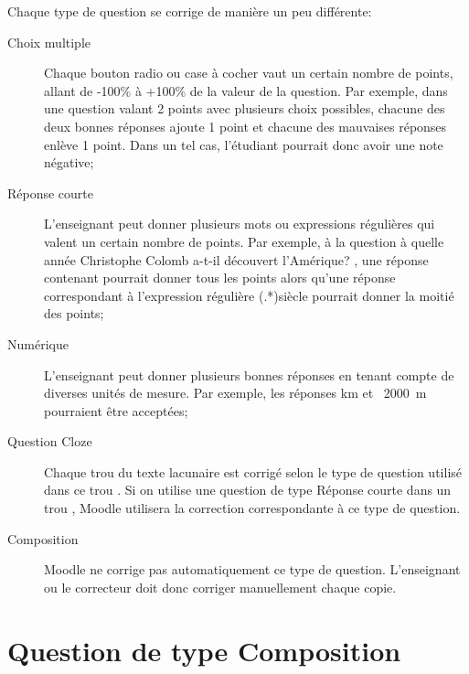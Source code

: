 \begin{minipage}{\linewidth}
Chaque type de question se corrige de mani\`ere un peu diff\'erente:
\begin{description}
  \item[Choix multiple]
  
  Chaque bouton radio ou case \`a cocher vaut un certain nombre de points, allant de -100\% \`a +100\% de la valeur de la question.
  Par exemple, dans une question valant 2 points avec plusieurs choix possibles, chacune des deux bonnes r\'eponses ajoute 1 point et chacune des mauvaises r\'eponses enl\`eve 1 point.
  Dans un tel cas, l'\'etudiant pourrait donc avoir une note n\'egative;
  
  \item[R\'eponse courte]
  
  L'enseignant peut donner plusieurs mots ou expressions r\'eguli\`eres qui valent un certain nombre de points. Par exemple,
  \`a la question \og{} \`a quelle ann\'ee Christophe Colomb a-t-il d\'ecouvert l'Am\'erique? \fg{}, une r\'eponse contenant  \fg{} pourrait donner tous les points alors qu'une r\'eponse correspondant \`a l'expression r\'eguli\`ere (.*)si\`ecle \fg{} pourrait donner la moiti\'e des points;
  
  \item[Num\'erique]
  
  L'enseignant peut donner plusieurs bonnes r\'eponses en tenant compte de diverses unit\'es de mesure.
  Par exemple, les r\'eponses  km \fg{} et  \og~2000~m~\fg{} pourraient \^etre accept\'ees;
  
  \item[Question Cloze]
  
  Chaque \og trou \fg{} du texte lacunaire est corrig\'e selon le type de question utilis\'e dans ce \og trou \fg{}.
  Si on utilise une question de type R\'eponse courte dans un \og trou \fg{}, Moodle utilisera la correction correspondante \`a ce type de question.
  
  \item[Composition]
  
  Moodle ne corrige pas automatiquement ce type de question.
  L'enseignant ou le correcteur doit donc corriger manuellement chaque copie.
\end{description}
\end{minipage}

\section{Question de type Composition}

